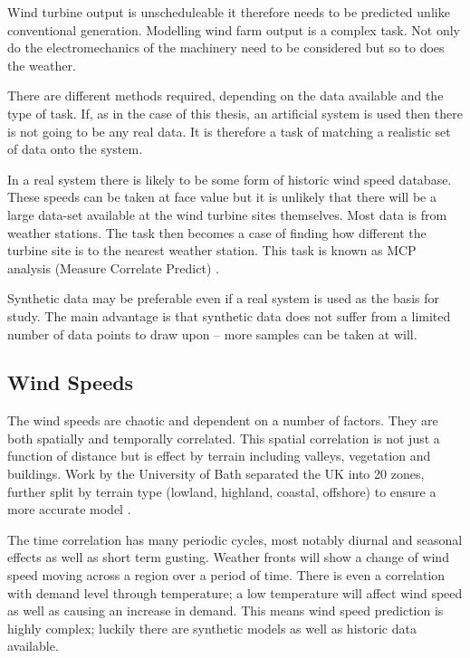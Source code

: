\documentclass[a4paper,oneside,12pt]{report}
\begin{document}
Wind turbine output is unscheduleable it therefore needs to be predicted unlike conventional generation. Modelling wind farm output is a complex task. Not only do the electromechanics of the machinery need to be considered but so to does the weather.

There are different methods required, depending on the data available and the type of task. If, as in the case of this thesis, an artificial system is used then there is not going to be any real data. It is therefore a task of matching a realistic set of data onto the system.

In a real system there is likely to be some form of historic wind speed database. These speeds can be taken at face value but it is unlikely that there will be a large data-set available at the wind turbine sites themselves. Most data is from weather stations. The task then becomes a case of finding how different the turbine site is to the nearest weather station. This task is known as MCP analysis (Measure Correlate Predict) \cite{Thoegersen2007, Rogers2005}.

Synthetic data may be preferable \cite{Sturt2009} even if a real system is used as the basis for study. The main advantage is that synthetic data does not suffer from a limited number of data points to draw upon -- more samples can be taken at will.

\subsection{Wind Speeds}
The wind speeds are chaotic and dependent on a number of factors. They are both spatially and temporally correlated. This spatial correlation is not just a function of distance but is effect by terrain including valleys, vegetation and buildings. Work by the University of Bath separated the UK into 20 zones, further split by terrain type (lowland, highland, coastal, offshore) to ensure a more accurate model \cite{UniversityofBath2006}.

The time correlation has many periodic cycles, most notably diurnal and seasonal effects as well as short term gusting. Weather fronts will show a change of wind speed moving across a region over a period of time. There is even a correlation with demand level through temperature; a low temperature will affect wind speed as well as causing an increase in demand. This means wind speed prediction is highly complex; luckily there are synthetic models as well as historic data available.
\end{document}
